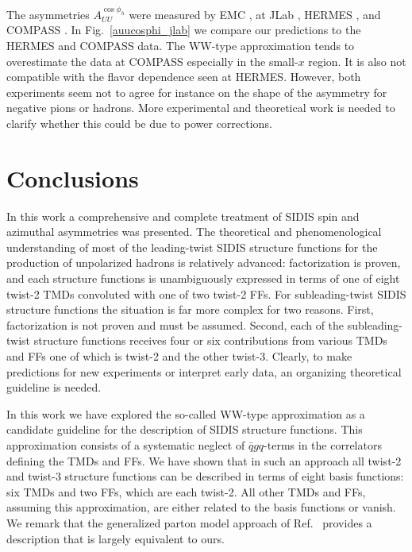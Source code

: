 \documentclass[a4paper,11pt]{article}
\begin{document}
The asymmetries $A_{UU}^{\cos\phi_h}$ were measured by
EMC \cite{Aubert:1983cz}, at JLab \cite{Osipenko:2008aa,Mkrtchyan:2007sr},
HERMES \cite{Airapetian:2012yg}, and COMPASS \cite{Adolph:2014pwc}.
In Fig.~\ref{auucosphi_jlab} we compare our predictions to the HERMES and
COMPASS data.
The WW-type approximation tends to overestimate the data at
COMPASS especially in the small-$x$ region. It is also not
compatible with the flavor dependence seen at HERMES.
However, both experiments seem not to agree for instance on the shape
of the asymmetry for negative pions or hadrons. More experimental and
theoretical work is needed to clarify whether this could be due to
power corrections.




\section{Conclusions}
\label{Sec-8:conclusions}

In this work a comprehensive and complete treatment of SIDIS
spin and azimuthal asymmetries was presented.
The theoretical and phenomenological understanding of most of the
leading-twist SIDIS structure functions for the production of
unpolarized hadrons is relatively advanced: factorization is
proven, and each structure functions is unambiguously expressed in
terms of one of eight twist-2 TMDs convoluted with one of two twist-2 FFs.
For subleading-twist SIDIS structure functions the situation
is far more complex for two reasons. First, factorization is not
proven and must be assumed.
Second, each of the subleading-twist structure functions
receives four or six contributions from various TMDs and FFs one of
which is twist-2 and the other twist-3. Clearly, to make
predictions for new experiments or interpret early data, an
organizing theoretical guideline is needed.

In this work we have explored the so-called WW-type approximation
as a candidate guideline for the description of SIDIS structure
functions. This approximation consists of a systematic neglect
of $\bar{q}gq$-terms in the
correlators defining the TMDs and FFs. We have shown that in such
an approach all twist-2 and twist-3 structure functions can be
described in terms of eight basis functions: six TMDs and two FFs,
which are each twist-2. All other TMDs and FFs, assuming this
approximation, are either related to the basis functions or
vanish.
We remark that the generalized parton model
approach of Ref.~\cite{Anselmino:2011ch} provides a description
that is largely equivalent to ours.
\end{document}
